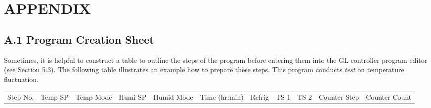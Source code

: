 \chapter{APPENDIX}


\section{A.1 Program Creation
Sheet}

Sometimes, it is helpful to construct a table to outline the steps of
the program before entering them into the GL controller program editor
(see Section 5.3). The following table illustrates an example how to
prepare these steps. This program conducts \emph{test} on temperature
fluctuation.

\begin{longtable}[]{@{}lllllllllll@{}}
\toprule
\begin{minipage}[b]{0.09\columnwidth}\raggedright
Step No.\strut
\end{minipage} & \begin{minipage}[b]{0.05\columnwidth}\raggedright
Temp SP\strut
\end{minipage} & \begin{minipage}[b]{0.09\columnwidth}\raggedright
Temp Mode\strut
\end{minipage} & \begin{minipage}[b]{0.06\columnwidth}\raggedright
Humi SP\strut
\end{minipage} & \begin{minipage}[b]{0.06\columnwidth}\raggedright
Humid Mode\strut
\end{minipage} & \begin{minipage}[b]{0.12\columnwidth}\raggedright
Time (hr:min)\strut
\end{minipage} & \begin{minipage}[b]{0.08\columnwidth}\raggedright
Refrig\strut
\end{minipage} & \begin{minipage}[b]{0.04\columnwidth}\raggedright
TS 1\strut
\end{minipage} & \begin{minipage}[b]{0.05\columnwidth}\raggedright
TS 2\strut
\end{minipage} & \begin{minipage}[b]{0.03\columnwidth}\raggedright
Counter Step\strut
\end{minipage} & \begin{minipage}[b]{0.03\columnwidth}\raggedright
Counter Count\strut

\end{minipage}
\end{longtable}
